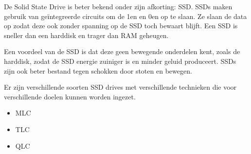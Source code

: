 De Solid State Drive is beter bekend onder zijn afkorting: SSD. SSDs maken gebruik van ge\"integreerde circuits om de 1en en 0en op te slaan. Ze slaan de data op zodat deze ook zonder spanning op de SSD toch bewaart blijft. Een SSD is sneller dan een harddisk en trager dan RAM geheugen.

Een voordeel van de SSD is dat deze geen bewegende onderdelen kent, zoals de harddisk, zodat de SSD energie zuiniger is en minder geluid produceert. SSDs zijn ook beter bestand tegen schokken door stoten en bewegen.

Er zijn verschillende soorten SSD drives met verschillende technieken die voor verschillende doelen kunnen worden ingezet.
\begin{itemize}
\item MLC
\item TLC
\item QLC
\end{itemize}

